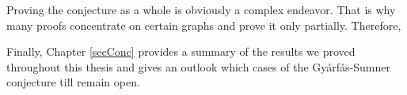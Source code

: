 Proving the conjecture as a whole is obviously a complex endeavor. That is why many proofs concentrate on certain graphs and prove it only partially. Therefore,


Finally, Chapter \ref{secConc} provides a summary of the results we proved throughout this thesis and gives an outlook which cases of the Gyárfás-Sumner conjecture till remain open.